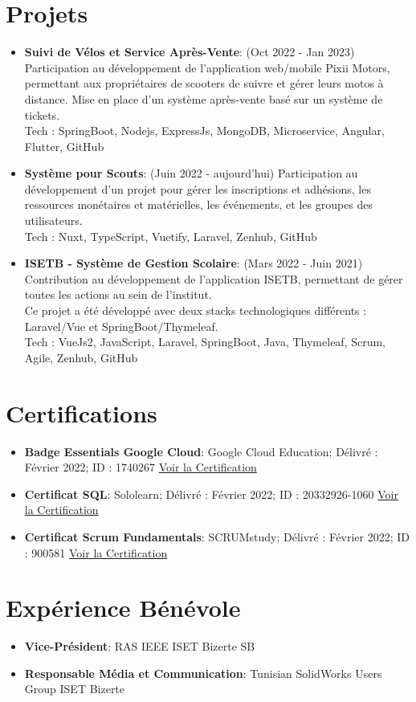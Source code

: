 \documentclass[a4paper,20pt]{article}
\newcommand{\resumeItem}[2]{
  \item\small{
    \textbf{#1}{: #2 \vspace{-2pt}}
  }
}
\newcommand{\resumeSubItem}[2]{\resumeItem{#1}{#2}\vspace{-3pt}}
\newcommand{\resumeSubHeadingListStart}{\begin{itemize}[leftmargin=*]}
\newcommand{\resumeSubHeadingListEnd}{\end{itemize}}
\begin{document}
\section{Projets}
\resumeSubHeadingListStart
\resumeSubItem{Suivi de Vélos et Service Après-Vente}{(Oct 2022 - Jan 2023)
 Participation au développement de l'application web/mobile Pixii Motors, permettant aux propriétaires de scooters de suivre et gérer leurs motos à distance. Mise en place d'un système après-vente basé sur un système de tickets.
\\ Tech : SpringBoot, Nodejs, ExpressJs, MongoDB, Microservice, Angular, Flutter, GitHub}
\vspace{2pt}
\resumeSubItem{Système pour Scouts}{(Juin 2022 - aujourd’hui)
 Participation au développement d'un projet pour gérer les inscriptions et adhésions, les ressources monétaires et matérielles, les événements, et les groupes des utilisateurs.
\\ Tech : Nuxt, TypeScript, Vuetify, Laravel, Zenhub, GitHub}
\vspace{2pt}
\resumeSubItem{ISETB - Système de Gestion Scolaire}{(Mars 2022 - Juin 2021)
 Contribution au développement de l'application ISETB, permettant de gérer toutes les actions au sein de l’institut.
 \\\small{Ce projet a été développé avec deux stacks technologiques différents : Laravel/Vue et SpringBoot/Thymeleaf.}
\\ Tech : VueJs2, JavaScript, Laravel, SpringBoot, Java, Thymeleaf, Scrum, Agile, Zenhub, GitHub}
\resumeSubHeadingListEnd

\vspace{-5pt}
\section{Certifications}
\resumeSubHeadingListStart
\resumeSubItem{Badge Essentials Google Cloud}
    {Google Cloud Education; Délivré : Février 2022; ID : 1740267}
    {\href{https://www.cloudskillsboost.google/public_profiles/b6cf5253-6dac-4b50-8a0d-7129daad930b/badges/1740267}{Voir la Certification}}
\resumeSubItem{Certificat SQL}
    {Sololearn; Délivré : Février 2022; ID : 20332926-1060}
    {\href{https://www.sololearn.com/certificates/course/en/20332926/1060/landscape/png}{Voir la Certification}}
\resumeSubItem{Certificat Scrum Fundamentals}
    {SCRUMstudy; Délivré : Février 2022; ID : 900581}
    {\href{https://c46e136a583f7e334124-ac22991740ab4ff17e21daf2ed577041.ssl.cf1.rackcdn.com/Certificate/ScrumFundamentalsCertified-MohamedYoussefChlendi-900581.pdf}{Voir la Certification}}
\resumeSubHeadingListEnd

\vspace{-2pt}
\section{Expérience Bénévole}
\resumeSubHeadingListStart
\resumeItem{Vice-Président}{RAS IEEE ISET Bizerte SB}
\resumeItem{Responsable Média et Communication}{Tunisian SolidWorks Users Group ISET Bizerte}
\resumeSubHeadingListEnd
\end{document}
